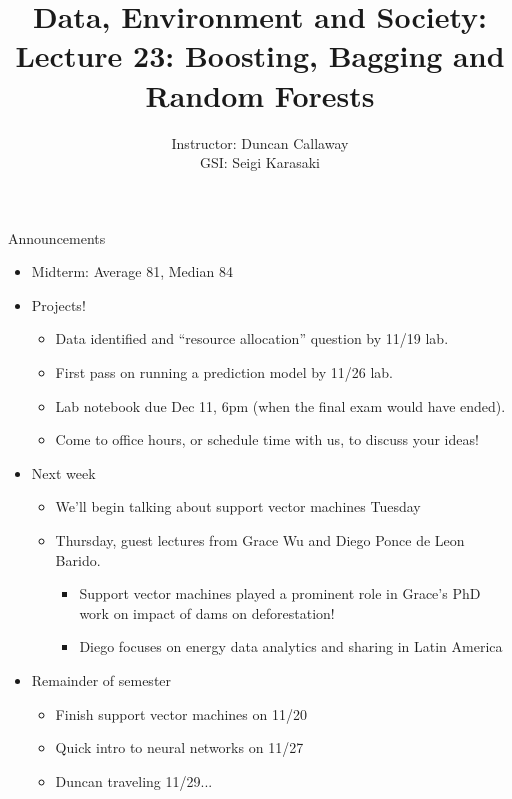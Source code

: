 \documentclass[mathserif, aspectratio=169]{beamer}
\title[Lecture 23] %
{Data, Environment and Society: \\{Lecture 23: Boosting, Bagging and Random Forests}}
\author[ER190C: Data, Environment and Society] 
{Instructor: Duncan Callaway\\
GSI: Seigi Karasaki}
\institute[UC Berkeley] %
 {\small{ \bf November 8, 2018}}
\date[November 8, 2018]
\begin{document}
\frame{
  \titlepage
}

\begin{frame}{Announcements}

\begin{itemize}
\item Midterm: Average 81, Median 84
\item Projects!
\begin{itemize}
\item Data identified and ``resource allocation'' question by 11/19 lab.
\item First pass on running a prediction model by 11/26 lab.
\item Lab notebook due Dec 11, 6pm (when the final exam would have ended).
\item Come to office hours, or schedule time with us, to discuss your ideas!
\end{itemize}
\item Next week
\begin{itemize}
\item We'll begin talking about support vector machines Tuesday
\item Thursday, guest lectures from Grace Wu and Diego Ponce de Leon Barido.
\begin{itemize}
\item Support vector machines played a prominent role in Grace's PhD work on impact of dams on deforestation!
\item Diego focuses on energy data analytics and sharing in Latin America
\end{itemize}
\end{itemize}
\item Remainder of semester
\begin{itemize}
\item Finish support vector machines on 11/20
\item Quick intro to neural networks on 11/27
\item Duncan traveling 11/29...
\end{itemize}
\end{itemize}


\end{frame}
\end{document}
